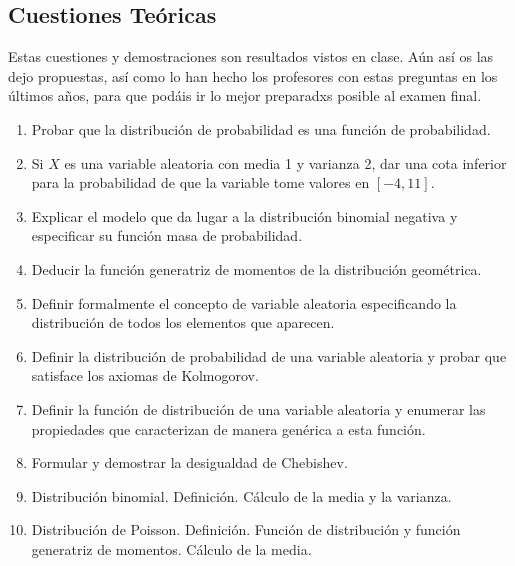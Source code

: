 \documentclass[fleqn]{article}
\begin{document}
\begin{enumerate}
                
                \newpage
                
                \subsection{Cuestiones Teóricas}

                        Estas cuestiones y demostraciones son resultados vistos en clase. Aún así os las dejo propuestas, así como lo han hecho los profesores con estas 
                        preguntas en los últimos años, para que podáis ir lo mejor preparadxs posible al examen final.
                        \begin{enumerate}
                                \item Probar que la distribución de probabilidad es una función de probabilidad.
                                \item Si $X$ es una variable aleatoria con media 1 y varianza 2, dar una cota inferior para la probabilidad
                                        de que la variable tome valores en $[-4, 11]$.
                                \item Explicar el modelo que da lugar a la distribución binomial negativa y especificar su función masa de probabilidad.
                                \item Deducir la función generatriz de momentos de la distribución geométrica.
                                \item Definir formalmente el concepto de variable aleatoria especificando la distribución de todos los elementos
                                        que aparecen.
                                \item Definir la distribución de probabilidad de una variable aleatoria y probar que satisface los axiomas de Kolmogorov.
                                \item Definir la función de distribución de una variable aleatoria y enumerar las propiedades que caracterizan de manera
                                        genérica a esta función.
                                \item Formular y demostrar la desigualdad de Chebishev.
                                \item Distribución binomial. Definición. Cálculo de la media y la varianza.
                                \item Distribución de Poisson. Definición. Función de distribución y función generatriz de momentos. Cálculo de la media.
                                

\end{enumerate}
\end{enumerate}
\end{document}
